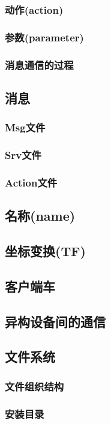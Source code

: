 \documentclass[geye,green,kindle,cn]{elegantnote}
\begin{document}
\subsubsection{动作(action)}
\subsubsection{参数(parameter)}
\subsubsection{消息通信的过程}
\subsection{消息}
\subsubsection{Msg文件}
\subsubsection{Srv文件}
\subsubsection{Action文件}
\subsection{名称(name)}
\subsection{坐标变换(TF)}
\subsection{客户端车}
\subsection{异构设备间的通信}
\subsection{文件系统}
\subsubsection{文件组织结构}
\subsubsection{安装目录}
\end{document}
